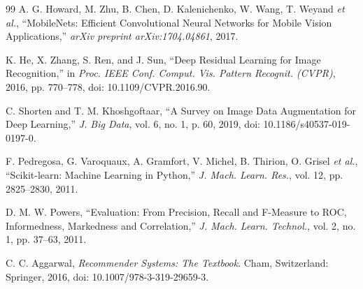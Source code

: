 \documentclass[10pt,a4paper]{article}
\begin{document}
\begin{thebibliography}{99}
A. G. Howard, M. Zhu, B. Chen, D. Kalenichenko, W. Wang, T. Weyand \textit{et al.}, ``MobileNets: Efficient Convolutional Neural Networks for Mobile Vision Applications,'' \textit{arXiv preprint arXiv:1704.04861}, 2017.

K. He, X. Zhang, S. Ren, and J. Sun, ``Deep Residual Learning for Image Recognition,'' in \textit{Proc. IEEE Conf. Comput. Vis. Pattern Recognit. (CVPR)}, 2016, pp. 770--778, doi: 10.1109/CVPR.2016.90.

C. Shorten and T. M. Khoshgoftaar, ``A Survey on Image Data Augmentation for Deep Learning,'' \textit{J. Big Data}, vol. 6, no. 1, p. 60, 2019, doi: 10.1186/s40537-019-0197-0.

F. Pedregosa, G. Varoquaux, A. Gramfort, V. Michel, B. Thirion, O. Grisel \textit{et al.}, ``Scikit-learn: Machine Learning in Python,'' \textit{J. Mach. Learn. Res.}, vol. 12, pp. 2825--2830, 2011.

D. M. W. Powers, ``Evaluation: From Precision, Recall and F-Measure to ROC, Informedness, Markedness and Correlation,'' \textit{J. Mach. Learn. Technol.}, vol. 2, no. 1, pp. 37--63, 2011.

C. C. Aggarwal, \textit{Recommender Systems: The Textbook}. Cham, Switzerland: Springer, 2016, doi: 10.1007/978-3-319-29659-3.

\end{thebibliography}
\endgroup
\end{document}
